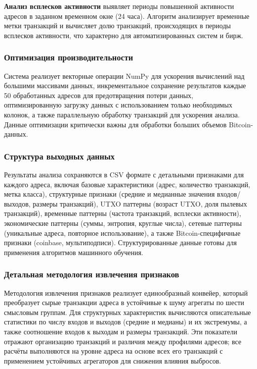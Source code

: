\textbf{Анализ всплесков активности} выявляет периоды повышенной активности адресов в заданном временном окне (24 часа). Алгоритм анализирует временные метки транзакций и вычисляет долю транзакций, происходящих в периоды всплесков активности, что характерно для автоматизированных систем и бирж.

\subsubsection{Оптимизация производительности}

Система реализует векторные операции NumPy для ускорения вычислений над большими массивами данных, инкрементальное сохранение результатов каждые 50 обработанных адресов для предотвращения потери данных, оптимизированную загрузку данных с использованием только необходимых колонок, а также параллельную обработку транзакций для ускорения анализа. Данные оптимизации критически важны для обработки больших объемов Bitcoin-данных.

\subsubsection{Структура выходных данных}

Результаты анализа сохраняются в CSV формате с детальными признаками для каждого адреса, включая базовые характеристики (адрес, количество транзакций, метка класса), структурные признаки (средние и медианные значения входов/выходов, размеры транзакций), UTXO паттерны (возраст UTXO, доля пылевых транзакций), временные паттерны (частота транзакций, всплески активности), экономические паттерны (суммы, энтропия, круглые числа), сетевые паттерны (уникальные адреса, повторное использование), а также Bitcoin-специфичные признаки (coinbase, мультиподписи). Структурированные данные готовы для применения алгоритмов машинного обучения.

\subsubsection{Детальная методология извлечения признаков}

Методология извлечения признаков реализует единообразный конвейер, который преобразует сырые транзакции адреса в устойчивые к шуму агрегаты по шести смысловым группам. Для структурных характеристик вычисляются описательные статистики по числу входов и выходов (средние и медианы) и их экстремумы, а также соотношение входов к выходам и размеры транзакций. Эти показатели отражают организацию транзакций и различия между профилями адресов; все расчёты выполняются на уровне адреса на основе всех его транзакций с применением устойчивых агрегаторов для снижения влияния выбросов.

